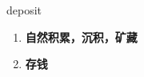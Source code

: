 
\begin{frame}
{\huge deposit}
\begin{center}
\begin{enumerate}\Large
  \item \textbf{自然积累，沉积，矿藏}
  \item \textbf{存钱}
\end{enumerate}
\end{center}
\end{frame}
